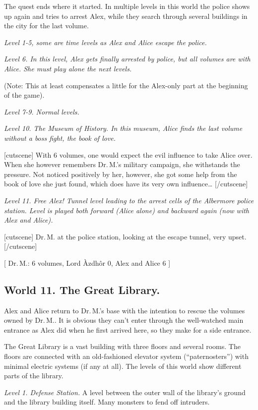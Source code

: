 \documentclass{gd-document}
\newcommand\DrM{Dr.\,M.\xspace}
\newcommand\Azdhor{Lord Àzdhôr\xspace}
\newcommand\level[1]{\textit{#1}}
\begin{document}
The quest ends where it started. In multiple levels in this world the
police shows up again and tries to arrest Alex, while they search
through several buildings in the city for the last volume.

\level{Level 1-5, some are time levels as Alex and Alice escape the police.}

\level{Level 6. In this level, Alex gets finally arrested by
  police, but all volumes are with Alice. She must play alone the next levels.}

(Note: This at least compensates a little for the Alex-only part at
the beginning of the game).

\level{Level 7-9. Normal levels.}

\level{Level 10. The Museum of History. In this museum, Alice finds the
  last volume without a boss fight, the book of love.}

[cutscene]
With 6 volumes, one would expect the evil influence to take Alice
over. When she however remembers \DrM{}’s military campaign, she withstands the
pressure. Not noticed positively by her, however, she got some help
from the book of love she just found, which does have its very own influence…
[/cutscene]

\level{Level 11. Free Alex! Tunnel level leading to the arrest cells
  of the Albermore police station. Level is played both forward (Alice
  alone) and backward again (now with Alex and Alice).}

[cutscene]
\DrM at the police station, looking at the escape tunnel, very upset.
[/cutscene]

[ \DrM: 6 volumes, \Azdhor 0, Alex and Alice 6 ]

\subsection{World 11. The Great Library.}

Alex and Alice return to \DrM{}’s base with the intention to rescue the
volumes owned by \DrM. It is obvious they can’t enter through the
well-watched main entrance as Alex did when he first arrived here, so
they make for a side entrance.

The Great Library is a vast building with three floors and several
rooms. The floors are connected with an old-fashioned elevator system
(“paternosters”) with minimal electric systems (if any at all). The
levels of this world show different parts of the library.

\level{Level 1. Defense Station.} A level between the outer wall of
the library’s ground and the library building itself. Many monsters to
fend off intruders.
\end{document}
